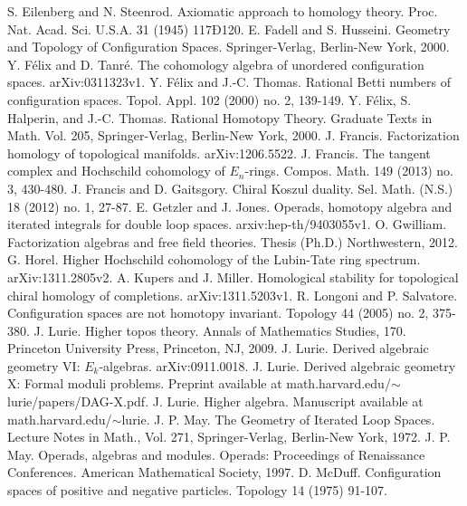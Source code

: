 \documentclass{compositio}
\theoremstyle{definition}\newtheorem{definition}{Definition}[section]
\theoremstyle{theorem}\newtheorem{lemma}[definition]{Lemma}
\theoremstyle{remark}\newtheorem*{conventions}{Conventions}
\theoremstyle{remark}\newtheorem*{acknowledgments}{Acknowledgments}
\theoremstyle{remark}\newtheorem*{outline}{Outline}
\theoremstyle{remark}\newtheorem*{questions}{Questions}
\theoremstyle{remark}\newtheorem{example}[definition]{Example}
\theoremstyle{definition}\newtheorem{construction}[definition]{Construction}
\theoremstyle{definition}\newtheorem*{convention}{Convention}
\theoremstyle{definition}\newtheorem*{conjecture}{Conjecture}
\theoremstyle{theorem}\newtheorem{theorem}[definition]{Theorem}
\theoremstyle{theorem}\newtheorem{paradigm}[definition]{Paradigm}
\theoremstyle{remark}\newtheorem{remark}[definition]{Remark}
\theoremstyle{corollary}\newtheorem{corollary}[definition]{Corollary}
\theoremstyle{theorem}\newtheorem{proposition}[definition]{Proposition}
\theoremstyle{definition}\newtheorem{question}[definition]{Question}
\begin{document}
\begin{thebibliography}{100}
 S. Eilenberg and N. Steenrod. Axiomatic approach to homology theory. Proc. Nat. Acad. Sci. U.S.A. 31 (1945) 117Ð120.
 E. Fadell and S. Husseini. Geometry and Topology of Configuration Spaces. Springer-Verlag, Berlin-New York, 2000.
 Y. F\'{e}lix and D. Tanr\'{e}. The cohomology algebra of unordered configuration spaces. arXiv:0311323v1.
 Y. F\'{e}lix and J.-C. Thomas. Rational Betti numbers of configuration spaces. Topol. Appl. 102 (2000) no. 2, 139-149.
 Y. F\'{e}lix, S. Halperin, and J.-C. Thomas. Rational Homotopy Theory. Graduate Texts in Math. Vol. 205, Springer-Verlag, Berlin-New York, 2000. 
 J. Francis. Factorization homology of topological manifolds. arXiv:1206.5522.
 J. Francis. The tangent complex and Hochschild cohomology of $E_n$-rings. Compos. Math. 149 (2013) no. 3, 430-480.
 J. Francis and D. Gaitsgory. Chiral Koszul duality. Sel. Math. (N.S.) 18 (2012) no. 1, 27-87.
 E. Getzler and J. Jones. Operads, homotopy algebra and iterated integrals for double loop spaces. arxiv:hep-th/9403055v1.
 O. Gwilliam. Factorization algebras and free field theories. Thesis (Ph.D.) Northwestern, 2012.
 G. Horel. Higher Hochschild cohomology of the Lubin-Tate ring spectrum. arXiv:1311.2805v2.
 A. Kupers and J. Miller. Homological stability for topological chiral homology of completions. arXiv:1311.5203v1.
 R. Longoni and P. Salvatore. Configuration spaces are not homotopy invariant. Topology 44 (2005) no. 2, 375-380.
 J. Lurie. Higher topos theory. Annals of Mathematics Studies, 170. Princeton University Press, Princeton, NJ, 2009.
 J. Lurie. Derived algebraic geometry VI: $E_k$-algebras. arXiv:0911.0018.
 J. Lurie. Derived algebraic geometry X: Formal moduli problems. Preprint available at math.harvard.edu/$\sim$lurie/papers/DAG-X.pdf.
 J. Lurie. Higher algebra. Manuscript available at math.harvard.edu/$\sim$lurie.
 J. P. May. The Geometry of Iterated Loop Spaces. Lecture Notes in Math., Vol. 271, Springer-Verlag, Berlin-New York, 1972.
 J. P. May. Operads, algebras and modules. Operads: Proceedings of Renaissance Conferences. American Mathematical Society, 1997. 
 D. McDuff. Configuration spaces of positive and negative particles. Topology 14 (1975) 91-107.

\end{thebibliography}
\end{document}
